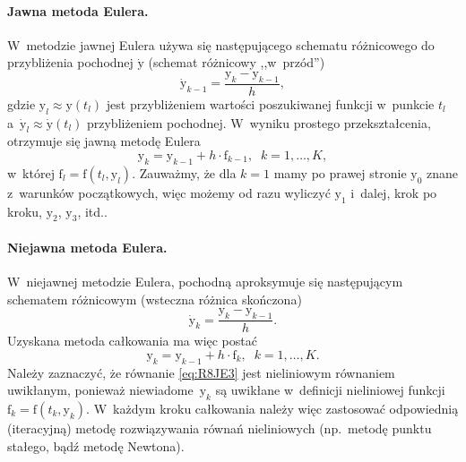 \documentclass[paper=a4,DIV=12]{lpas}
\newcommand{\brm}[1]{\bm{\mathrm{#1}}}
\begin{document}
\begin{appendices}
\paragraph{Jawna metoda Eulera.}
W~metodzie jawnej Eulera używa się następującego schematu różnicowego do
przybliżenia pochodnej $\dot{\brm{y}}$ (schemat różnicowy ,,w~przód'')
\begin{equation}
  \dot{\brm{y}}_{k-1} = \frac{\brm{y}_{k} - \brm{y}_{k-1}}{h},
  \label{eq:IHSVX}
\end{equation}
gdzie $\brm{y}_{l} \approx \brm{y}\left(t_l\right)$ jest przybliżeniem wartości
poszukiwanej funkcji w~punkcie $t_l$ a~$\dot{\brm{y}}_{l} \approx
\dot{\brm{y}}(t_l)$ przybliżeniem pochodnej. W~wyniku prostego przekształcenia,
otrzymuje się jawną metodę Eulera
\begin{equation}
  \brm{y}_k = \brm{y}_{k-1} + h \cdot \brm{f}_{k-1},\;\;k = 1,\dots,K,
 \label{eq:3PVVU}
\end{equation}
w~której $\brm{f}_l = \brm{f}\left(t_l, \brm{y}_l\right)$. Zauważmy, że dla
$k=1$ mamy po prawej stronie $\brm{y}_0$ znane z~warunków początkowych, więc
możemy od razu wyliczyć $\brm{y}_1$ i~dalej, krok po kroku, $\brm{y}_2$,
$\brm{y}_3$, itd..

\paragraph{Niejawna metoda Eulera.}
W~niejawnej metodzie Eulera, pochodną aproksymuje się następującym schematem
różnicowym (wsteczna różnica skończona)
\begin{equation}
  \dot{\brm{y}}_k = \frac{\brm{y}_{k} - \brm{y}_{k-1}}{h}.
  \label{eq:YNJO9}
\end{equation}
Uzyskana metoda całkowania ma więc postać
\begin{equation}
  \brm{y}_k = \brm{y}_{k-1} + h \cdot \brm{f}_{k},\;\;k = 1,\dots,K.
  \label{eq:R8JE3}
\end{equation}
Należy zaznaczyć, że równanie \eqref{eq:R8JE3} jest nieliniowym równaniem
uwikłanym, ponieważ niewiadome~$\brm{y}_k$ są uwikłane w~definicji nieliniowej
funkcji $\brm{f}_k = \brm{f}(t_k,\brm{y}_k)$. W~każdym kroku całkowania należy
więc zastosować odpowiednią (iteracyjną) metodę rozwiązywania równań
nieliniowych (np.~metodę punktu stałego, bądź metodę Newtona).


\end{appendices}
\end{document}
